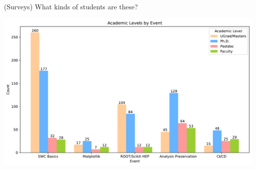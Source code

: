 \documentclass[aspectratio=169]{beamer}
\begin{document}
\begin{frame}{(Surveys) What kinds of students are these?}
\vspace{0.3 cm}
\begin{center}
\includegraphics[width=0.9\linewidth]{PLOTS/academic-level-by-event.pdf}
\end{center}
\end{frame}
\end{document}
